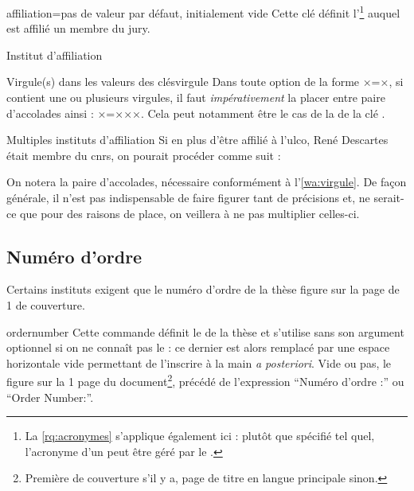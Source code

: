 \begin{docKey}{affiliation}{=}{pas de valeur par défaut,
    initialement vide}
  Cette clé définit l'\footnote{La \vref{rq:acronymes}
    s'applique également ici : plutôt que spécifié tel quel, l'acronyme d'un
     peut être géré par le .} auquel est
  affilié un membre du jury.
\end{docKey}
\begin{dbexample}{Institut d'affiliation}{}
\begin{bodycode}
\end{bodycode}
\end{dbexample}
%
\begin{dbwarning}{Virgule(s) dans les valeurs des clés}{virgule}
  Dans toute option de la forme ×=×, si 
  contient une ou plusieurs virgules, il faut \emph{impérativement} la placer
  entre paire d'accolades ainsi : ×={××}×. Cela peut
  notamment être le cas de la  de la clé .
\end{dbwarning}
%
\begin{dbexample}{Multiples instituts d'affiliation}{}
  Si en plus d'être affilié à l'\gls{ulco}, René Descartes était membre du
  \gls{cnrs}, on pourait procéder comme suit :
\begin{bodycode}
\end{bodycode}
On notera la paire d'accolades, nécessaire conformément
à l'\vref{wa:virgule}. De façon générale, il n'est pas indispensable de faire
figurer tant de précisions et, ne serait-ce que pour des raisons de place, on
veillera à ne pas multiplier celles-ci.
\end{dbexample}

\subsection{Numéro d'ordre}
\label{sec:numero-dordre}

Certains instituts exigent que le numéro d'ordre de la thèse figure sur la page
de 1\iere{} de couverture.

\begin{docCommand}{ordernumber}{}
  Cette commande définit le  de la thèse et s'utilise sans
  son argument optionnel si on ne connaît pas  le  : ce dernier est alors remplacé par une espace horizontale vide
  permettant de l'inscrire à la main \emph{a posteriori}. Vide ou pas, le
   figure sur  la 1\iere{} page
  du document\footnote{Première de couverture s'il y a, page de titre en langue
    principale sinon.}, précédé de l'expression \enquote{Num\'ero d'ordre :} ou
  \foreignquote{english}{Order Number:}\selonlangue.
\end{docCommand}

